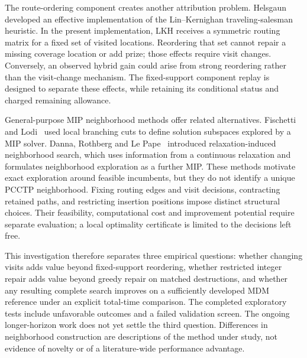 The route-ordering component creates another attribution problem.
Helsgaun~\cite{helsgaun2000} developed an effective implementation of the
Lin--Kernighan traveling-salesman heuristic. In the present implementation,
LKH receives a symmetric routing matrix for a fixed set of visited locations.
Reordering that set cannot repair a missing coverage location or add prize;
those effects require visit changes. Conversely, an observed hybrid gain
could arise from strong reordering rather than the visit-change mechanism.
The fixed-support component replay is designed to separate these effects,
while retaining its conditional status and charged remaining allowance.

General-purpose MIP neighborhood methods offer related alternatives.
Fischetti and Lodi~\cite{fischetti2003local} used local branching cuts to
define solution subspaces explored by a MIP solver. Danna, Rothberg and
Le Pape~\cite{danna2005rins} introduced relaxation-induced neighborhood
search, which uses information from a continuous relaxation and formulates
neighborhood exploration as a further MIP. These methods motivate exact
exploration around feasible incumbents, but they do not identify a unique
PCCTP neighborhood. Fixing routing edges and visit decisions, contracting
retained paths, and restricting insertion positions impose distinct
structural choices. Their feasibility, computational cost and improvement
potential require separate evaluation; a local optimality certificate is
limited to the decisions left free.

This investigation therefore separates three empirical questions: whether
changing visits adds value beyond fixed-support reordering, whether restricted
integer repair adds value beyond greedy repair on matched destructions, and
whether any resulting complete search improves on a sufficiently developed
MDM reference under an explicit total-time comparison. The completed
exploratory tests include unfavorable outcomes and a failed validation
screen. The ongoing longer-horizon work does not yet settle the third
question. Differences in neighborhood construction are descriptions of the
method under study, not evidence of novelty or of a literature-wide
performance advantage.
